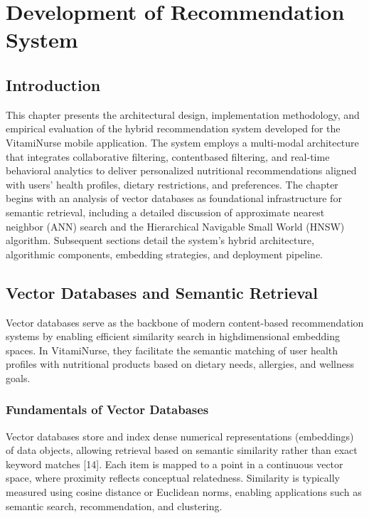 \chapter{Development of Recommendation
System}
\section*{Introduction}
This chapter presents the architectural design, implementation methodology, and empirical evaluation of the hybrid recommendation system
developed for the VitamiNurse mobile application. The system employs
a multi-modal architecture that integrates collaborative filtering, contentbased filtering, and real-time behavioral analytics to deliver personalized
nutritional recommendations aligned with users’ health profiles, dietary
restrictions, and preferences.
The chapter begins with an analysis of vector databases as foundational
infrastructure for semantic retrieval, including a detailed discussion of approximate nearest neighbor (ANN) search and the Hierarchical Navigable
Small World (HNSW) algorithm. Subsequent sections detail the system’s
hybrid architecture, algorithmic components, embedding strategies, and
deployment pipeline.

\section{Vector Databases and Semantic Retrieval}
Vector databases serve as the backbone of modern content-based recommendation systems by enabling efficient similarity search in highdimensional embedding spaces.
In VitamiNurse, they facilitate the semantic matching of user health
profiles with nutritional products based on dietary needs, allergies, and
wellness goals.
\subsection{Fundamentals of Vector Databases}
Vector databases store and index dense numerical representations (embeddings) of data objects, allowing retrieval based on semantic similarity
rather than exact keyword matches [14]. Each item is mapped to a point
in a continuous vector space, where proximity reflects conceptual relatedness. Similarity is typically measured using cosine distance or Euclidean
norms, enabling applications such as semantic search, recommendation,
and clustering.

